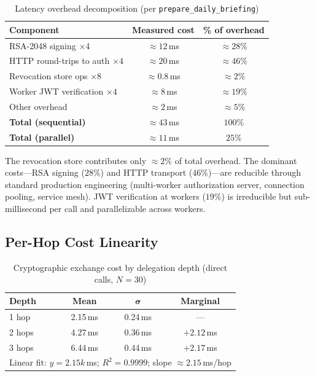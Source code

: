 \documentclass[journal]{IEEEtran}
\begin{document}
\begin{table}[h]
\caption{Latency overhead decomposition (per \texttt{prepare\_daily\_briefing})}
\label{tab:decomp}
\centering
\footnotesize
\begin{tabular}{lcc}
\toprule
\textbf{Component} & \textbf{Measured cost} & \textbf{\% of overhead} \\
\midrule
RSA-2048 signing $\times 4$    & $\approx 12$\,ms & $\approx 28\%$ \\
HTTP round-trips to auth $\times 4$ & $\approx 20$\,ms & $\approx 46\%$ \\
Revocation store ops $\times 8$    & $\approx 0.8$\,ms & $\approx 2\%$  \\
Worker JWT verification $\times 4$ & $\approx 8$\,ms & $\approx 19\%$ \\
Other overhead                     & $\approx 2$\,ms & $\approx 5\%$  \\
\midrule
\textbf{Total (sequential)}        & $\approx 43$\,ms & $100\%$  \\
\textbf{Total (parallel)}          & $\approx 11$\,ms & $25\%$   \\
\bottomrule
\end{tabular}
\end{table}

The revocation store contributes only $\approx 2\%$ of total overhead.
The dominant costs---RSA signing ($28\%$) and HTTP transport ($46\%$)---are
reducible through standard production engineering (multi-worker authorization
server, connection pooling, service mesh). JWT verification at workers ($19\%$)
is irreducible but sub-millisecond per call and parallelizable across workers.

\subsection{Per-Hop Cost Linearity}

\begin{table}[h]
\caption{Cryptographic exchange cost by delegation depth (direct calls, $N=30$)}
\label{tab:hopcosts}
\centering
\footnotesize
\begin{tabular}{lccc}
\toprule
\textbf{Depth} & \textbf{Mean} & $\boldsymbol\sigma$ & \textbf{Marginal} \\
\midrule
1 hop & 2.15\,ms & 0.24\,ms & --- \\
2 hops & 4.27\,ms & 0.36\,ms & $+2.12$\,ms \\
3 hops & 6.44\,ms & 0.44\,ms & $+2.17$\,ms \\
\midrule
\multicolumn{4}{l}{\scriptsize Linear fit: $y = 2.15k$\,ms;\; $R^2 = 0.9999$;\; slope $\approx 2.15$\,ms/hop} \\
\bottomrule
\end{tabular}
\end{table}
\end{document}
